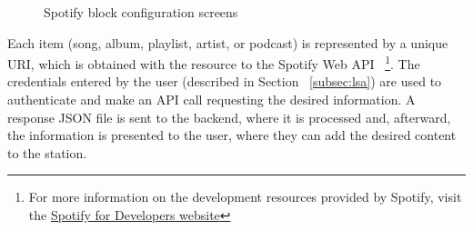 \begin{figure}[htbp]
	\centering
	 \qquad
	 \qquad
	\caption{Spotify block configuration screens}
	\label{fig:spp1}
\end{figure}

Each item (song, album, playlist, artist, or podcast) is represented by a unique \ac{URI}, which is obtained with the resource to the Spotify Web \ac{API} ~\footnote{For more information on the development resources provided by Spotify, visit the \href{https://developer.spotify.com/documentation/web-api/}{Spotify for Developers website}}. The credentials entered by the user (described in Section ~\ref{subsec:lsa}) are used to authenticate and make an API call requesting the desired information. A response JSON file is sent to the backend, where it is processed and, afterward, the information is presented to the user, where they can add the desired content to the station.

